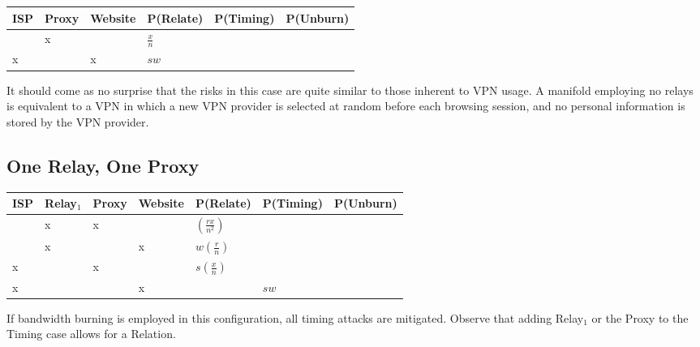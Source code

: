 
\begin{center}
\begin{tabular}{l | l | l | l | l | l}
  ISP & Proxy & Website & P(Relate)          & P(Timing) & P(Unburn) \\
  \hline
      & x     &         & $\frac{x}{n}$      & & \\
  \hline
  x   &       & x       & $sw$               & & \\
\end{tabular}
\end{center}

It should come as no surprise that the risks in this case are quite
similar to those inherent to VPN usage. A manifold employing no relays
is equivalent to a VPN in which a new VPN provider is selected at
random before each browsing session, and no personal information is
stored by the VPN provider.

\subsection{One Relay, One Proxy}


\begin{center}
\begin{tabular}{l | l | l | l | l | l | l}
  ISP & Relay$_1$ & Proxy & Website & P(Relate)          & P(Timing) & P(Unburn) \\
  \hline
      & x         & x     &         & $(\frac{rx}{n^2})$ & & \\
  \hline
      & x         &       & x       & $w(\frac{r}{n})$   & & \\
  \hline
  x   &           & x     &         & $s(\frac{x}{n})$   & & \\
  \hline
  x   &           &       & x       &                    & $sw$ & \\
\end{tabular}
\end{center}

If bandwidth burning is employed in this configuration, all timing
attacks are mitigated. Observe that adding Relay$_1$ or the Proxy to
the Timing case allows for a Relation.

